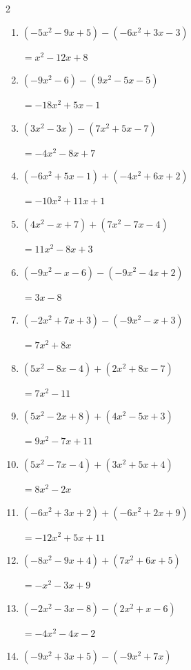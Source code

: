 \begin{multicols}{2}
\begin{enumerate}
        $=4x^{2}-9x-3$

  \item $(-5x^{2}-9x+5)-(-6x^{2}+3x-3)$

        $=x^{2}-12x+8$

  \item $(-9x^{2}-6)-(9x^{2}-5x-5)$

        $=-18x^{2}+5x-1$

  \item $(3x^{2}-3x)-(7x^{2}+5x-7)$

        $=-4x^{2}-8x+7$

  \item $(-6x^{2}+5x-1)+(-4x^{2}+6x+2)$

        $=-10x^{2}+11x+1$

  \item $(4x^{2}-x+7)+(7x^{2}-7x-4)$

        $=11x^{2}-8x+3$

  \item $(-9x^{2}-x-6)-(-9x^{2}-4x+2)$

        $=3x-8$

  \item $(-2x^{2}+7x+3)-(-9x^{2}-x+3)$

        $=7x^{2}+8x$

  \item $(5x^{2}-8x-4)+(2x^{2}+8x-7)$

        $=7x^{2}-11$

  \item $(5x^{2}-2x+8)+(4x^{2}-5x+3)$

        $=9x^{2}-7x+11$

  \item $(5x^{2}-7x-4)+(3x^{2}+5x+4)$

        $=8x^{2}-2x$

  \item $(-6x^{2}+3x+2)+(-6x^{2}+2x+9)$

        $=-12x^{2}+5x+11$

\columnbreak %

  \item $(-8x^{2}-9x+4)+(7x^{2}+6x+5)$

        $=-x^{2}-3x+9$

  \item $(-2x^{2}-3x-8)-(2x^{2}+x-6)$

        $=-4x^{2}-4x-2$

  \item $(-9x^{2}+3x+5)-(-9x^{2}+7x)$


\end{enumerate}
\end{multicols}
